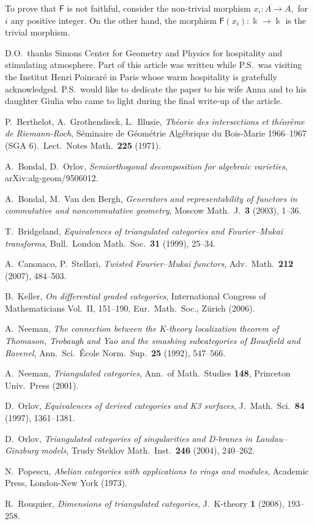\documentclass[a4paper,11pt,twoside]{amsart}
\numberwithin{equation}{section}
\theoremstyle{definition}
\begin{document}
To prove that ${\mathsf{{F}}}$ is not faithful, consider the
non-trivial morphism $x_i:A\to A,$ for $i$ any positive integer. On
the other hand, the morphism ${\mathsf{{F}}}(x_i):{\Bbbk}\to{\Bbbk}$ is the trivial morphism.

\bigskip

{\small{}
D.O.\ thanks Simons Center for Geometry and Physics for  hospitality and stimulating atmosphere. Part of this article was written while P.S.\ was visiting the Institut Henri Poincar\'e in Paris whose warm hospitality is gratefully acknowledged. P.S.\ would like to dedicate the paper to his wife Anna and to his daughter Giulia who came to light during the final write-up of the article.}

\begin{thebibliography}{99}
	
 P.\ Berthelot, A.\ Grothendieck, L.\ Illusie, \emph{Th\'eorie des intersections et th\'eor\`eme de Riemann-Roch}, S\'eminaire de G\'eom\'etrie Alg\'ebrique du Bois-Marie 1966--1967
(SGA 6).\ Lect.\ Notes Math.\, {\bf 225} (1971).

 A.\ Bondal, D.\ Orlov, \emph{Semiorthogonal decomposition for algebraic varieties}, arXiv:alg-geom/9506012.

 A.\ Bondal, M.\ Van den Bergh, \emph{Generators and representability of functors in commutative and noncommutative geometry}, Moscow Math.\ J.\ {\bf 3} (2003), 1--36.

 T.\ Bridgeland, \emph{Equivalences of triangulated categories and Fourier--Mukai transforms}, Bull.\ London Math.\ Soc.\ {\bf 31} (1999), 25--34.

 A.\ Canonaco, P.\ Stellari, \emph{Twisted Fourier--Mukai functors}, Adv.\ Math.\ {\bf 212} (2007), 484--503.

 B.\ Keller, \emph{On differential graded categories}, International Congress of Mathematicians Vol.\ II, 151--190, Eur.\ Math.\ Soc., Z\"urich (2006).

 A.\ Neeman, \emph{The connection between the K-theory localization theorem of Thomason, Trobaugh and Yao and the smashing subcategories of Bousfield and Ravenel}, Ann.\ Sci.\ \'{E}cole Norm.\ Sup.\ {\bf 25} (1992), 547--566.

 A.\ Neeman, \emph{Triangulated categories}, Ann.\ of Math.\ Studies {\bf 148}, Princeton Univ.\ Press (2001).

 D.\ Orlov, \emph{Equivalences of derived categories and K3 surfaces}, J.\ Math.\ Sci.\ {\bf 84} (1997), 1361--1381.
	
 D.\ Orlov, \emph{Triangulated categories of singularities and D-branes in Landau--Ginzburg models}, Trudy Steklov Math.\ Inst.\ {\bf 246} (2004), 240--262.

 N.\ Popescu, \emph{Abelian categories with applications to rings and modules}, Academic Press, London-New York (1973).

 R.\ Rouquier, \emph{Dimensions of triangulated categories}, J.\ K-theory {\bf 1} (2008), 193--258.

\end{thebibliography}
\end{document}
